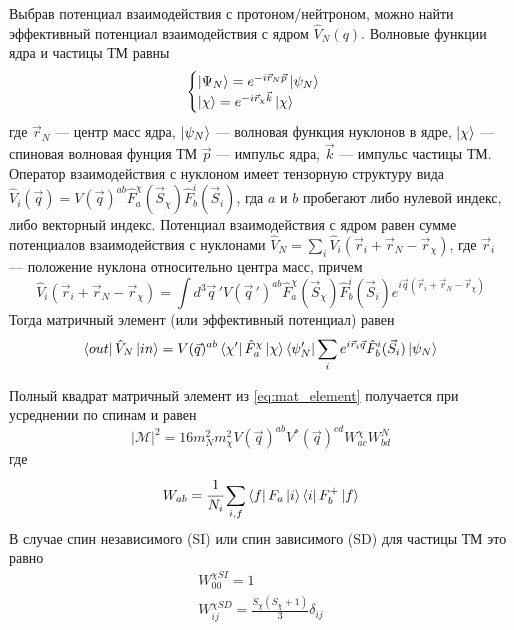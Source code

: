 Выбрав потенциал взаимодействия с протоном/нейтроном, можно найти эффективный потенциал взаимодействия с ядром $\hat{V}_{N}(q)$. Волновые функции ядра и частицы ТМ равны
\begin{equation}
	\begin{cases}
		\ket{\Psi_N} = e^{-i\vec{r}_N \vec{p}} \ket{\psi_N} \\
		\ket{\chi} = e^{-i\vec{r}_{\chi} \vec{k}} \ket{\chi} \\
	\end{cases}
\end{equation}
где $\vec{r}_N$ --- центр масс ядра, $\ket{\psi_N}$ --- волновая функция нуклонов в ядре, $\ket{\chi}$ --- спиновая волновая фунция ТМ $\vec{p}$ --- импульс ядра, $\vec{k}$ --- импульс частицы ТМ. Оператор взаимодействия с нуклоном имеет тензорную структуру вида $\hat{V}_{i}(\vec{q}) = V(\vec{q})^{ab} \hat{F}^{\chi}_a(\vec{S}_{\chi})\hat{F}^{i}_b(\vec{S}_{i})$, гда $a$ и $b$ пробегают либо нулевой индекс, либо векторный индекс. Потенциал взаимодействия с ядром равен сумме потенциалов взаимодействия с нуклонами $\hat{V}_{N} = \sum_i{\hat{V}_{i}(\vec{r}_i + \vec{r}_N - \vec{r}_{\chi})}$, где $\vec{r}_i$ --- положение нуклона относительно центра масс, причем 
\begin{equation}
	\hat{V}_{i}(\vec{r}_i + \vec{r}_N - \vec{r}_{\chi}) = 
	\int{d^3\vec{q}\,' V(\vec{q}\,')^{ab} \hat{F}^{\chi}_a(\vec{S}_{\chi})\hat{F}^{i}_b(\vec{S}_{i})} e^{i\vec{q}(\vec{r}_i + \vec{r}_N - \vec{r}_{\chi})}
\end{equation}
Тогда матричный элемент (или эффективный потенциал) равен 
\begin{equation}
\begin{split}
	\bra{out}\hat{V}_{N}\ket{in} = V(\vec{q})^{ab} \bra{\chi'}\hat{F}^{\chi}_a\ket{\chi} 
	\bra{\psi_N'} \sum_i{e^{i\vec{r}_i\vec{q}}} \hat{F}^{i}_b(\vec{S}_{i})\ket{\psi_N}
\end{split}
\end{equation}

Полный квадрат матричный элемент из \ref{eq:mat_element} получается при усреднении по спинам и равен
\begin{equation}
	|\mathcal{M}|^2 = 16 m_N^2 m_{\chi}^2 V(\vec{q})^{ab} V^*(\vec{q})^{cd} W^{\chi}_{ac} W^{N}_{bd}
\end{equation}
где
\begin{equation}
	W_{ab} = \cfrac{1}{N_i}\sum_{i,f}{\bra{f}F_a\ket{i}\bra{i}F^+_b\ket{f}} 
\end{equation}
В случае спин независимого (SI) или спин зависимого (SD) для частицы ТМ это равно
\begin{equation}
	\begin{split}
		W^{\chi SI}_{00} = 1 \\ 
		W^{\chi SD}_{ij} = \frac{S_{\chi}(S_{\chi}+1)}{3} \delta_{ij} \\
	\end{split}
\end{equation}


